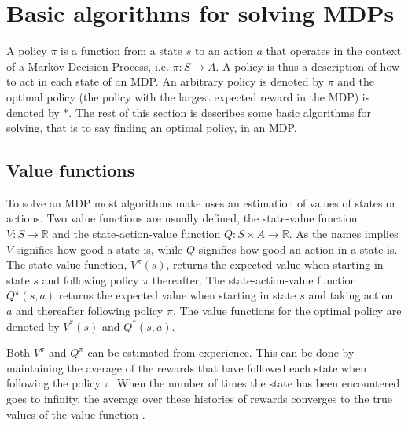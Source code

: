 \section{Basic algorithms for solving MDPs}

A policy $\pi$ is a function from a state $s$ to an action $a$ that operates in the context of a Markov Decision Process, i.e. $\pi \colon S \to A$. A policy is thus a description of how to act in each state of an MDP. An arbitrary policy is denoted by $\pi$ and the optimal policy (the policy with the largest expected reward in the MDP) is denoted by $*$. The rest of this section is describes some basic algorithms for solving, that is to say finding an optimal policy, in an MDP.


\subsection{Value functions}

To solve an MDP most algorithms make uses an estimation of values of states or actions. Two value functions are usually defined, the state-value function $V : S \to \mathbb R$ and the state-action-value function $Q : S \times A \to \mathbb R$. As the names implies $V$ signifies how good a state is, while $Q$ signifies how good an action in a state is. The state-value function, $V^\pi(s)$, returns the expected value when starting in state $s$ and following policy $\pi$ thereafter. The state-action-value function $Q^\pi(s, a)$ returns the expected value when starting in state $s$ and taking action $a$ and thereafter following policy $\pi$. The value functions for the optimal policy are denoted by $V^*(s)$ and $Q^*(s, a)$. 

Both $V^\pi$ and $Q^\pi$ can be estimated from experience. This can be done by maintaining the average of the rewards that have followed each state when following the policy $\pi$. When the number of times the state has been encountered goes to infinity, the average over these histories of rewards converges to the true values of the value function \parencite{barto1998reinforcement}.






